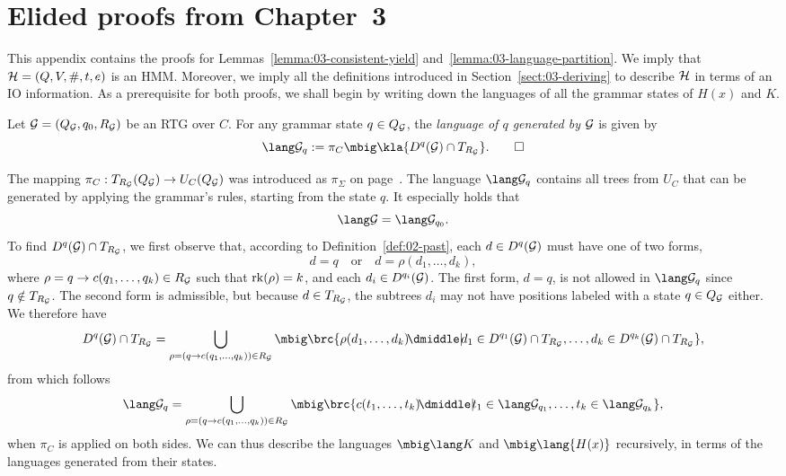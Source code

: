 \section{Elided proofs from Chapter~3}\label{sec:appendix-hk-proofs}

This appendix contains the proofs for Lemmas~\ref{lemma:03-consistent-yield}
and~\ref{lemma:03-language-partition}. We imply that $\mathcal H = (Q,V,\#,t,e)$ is an
HMM. Moreover, we imply all the definitions introduced in
Section~\ref{sect:03-deriving} to describe $\mathcal H$ in terms of an IO information.
As a prerequisite for both proofs, we shall begin by writing down the languages
of all the grammar states of $H(x)$ and $K$.

\begin{definition}
 Let $\mathcal G = (Q_\mathcal G,q_0,R_\mathcal G)$ be an RTG over $C$. For any grammar state $q\in
 Q_\mathcal G$, the \emph{language of $q$ generated by $\mathcal G$} is given by
 \[
  \lang\ug_q := \pi_C\mbig\kla{D^q(\ug)\cap T_{R_\ug}}.
  \qedhere
 \]
\end{definition}

The mapping $\pi_C:T_{R_\mathcal G}(Q_\mathcal G)\to U_C(Q_\mathcal G)$ was introduced as $\pi_\Sigma$ on
page~\pageref{def:02-pi-sigma}. The language $\lang\ug_q$ contains all trees
from $U_C$ that can be generated by applying the grammar's rules, starting from
the state $q$. It especially holds that
\begin{equation}\label{eq:a1}
 \lang\ug = \lang\ug_{q_0}.
\end{equation}
To find $D^q(\mathcal G)\cap T_{R_\mathcal G}$, we first observe that, according to
Definition~\ref{def:02-past}, each $d\in D^q(\mathcal G)$ must have one of two forms,
\[
 d = q \quad\text{or}\quad d = \rho(d_1,\ldots,d_k),
\]
where $\rho=q\to c(q_1,\ldots,q_k)\in R_\mathcal G$ such that $\operatorname{rk}(\rho) = k$, and
each $d_i\in D^{q_i}(\mathcal G)$. The first form, $d = q$, is not allowed in
$\lang\ug_q$ since $q\notin T_{R_\mathcal G}$. The second form is admissible, but
because $d\in T_{R_\mathcal G}$, the subtrees $d_i$ may not have positions labeled with
a state $q\in Q_\mathcal G$ either. We therefore have
\[
 D^q(\ug)\cap T_{R_\ug} = \bigcup_{\rho=(q\to c(q_1,\ldots,q_k))\in R_\ug}
 \mbig\brc{\rho(d_1,\ldots,d_k) \npipe d_1\in D^{q_1}(\ug)\cap T_{R_\ug},\ldots, d_k\in D^{q_k}(\ug)\cap T_{R_\ug}},
\]
from which follows
\begin{equation}
 \label{eq:a2}
 \lang\ug_q = \bigcup_{\rho=(q\to c(q_1,\ldots,q_k))\in R_\ug}
 \mbig\brc{c(t_1,\ldots,t_k) \npipe t_1\in\lang\ug_{q_1},\ldots, t_k\in\lang\ug_{q_k}},
\end{equation}
when $\pi_C$ is applied on both sides. We can thus describe the languages
$\mbig\lang K$ and $\mbig\lang{H(x)}$ recursively, in terms of the languages
generated from their states.


